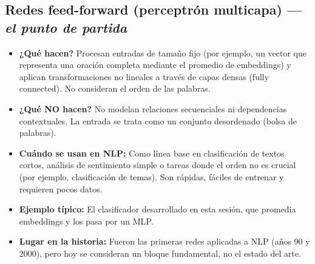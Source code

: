 \documentclass[12pt,a4paper,openany,oneside]{book}
\begin{document}
\subsection{Redes feed-forward (perceptrón multicapa) — \textit{el punto de partida}}
\begin{itemize}
\item \textbf{¿Qué hacen?} Procesan entradas de tamaño fijo (por ejemplo, un vector que representa una oración completa mediante el promedio de embeddings) y aplican transformaciones no lineales a través de capas densas (fully connected). No consideran el orden de las palabras.
\item \textbf{¿Qué NO hacen?} No modelan relaciones secuenciales ni dependencias contextuales. La entrada se trata como un conjunto desordenado (bolsa de palabras).
\item \textbf{Cuándo se usan en NLP:} Como línea base en clasificación de textos cortos, análisis de sentimiento simple o tareas donde el orden no es crucial (por ejemplo, clasificación de temas). Son rápidas, fáciles de entrenar y requieren pocos datos.
\item \textbf{Ejemplo típico:} El clasificador desarrollado en esta sesión, que promedia embeddings y los pasa por un MLP.
\item \textbf{Lugar en la historia:} Fueron las primeras redes aplicadas a NLP (años 90 y 2000), pero hoy se consideran un bloque fundamental, no el estado del arte.
\end{itemize}
\end{document}
